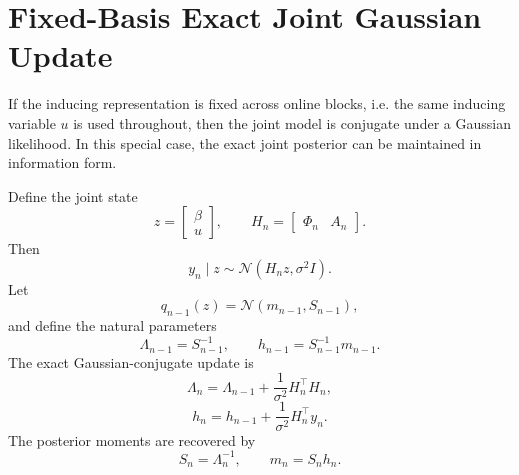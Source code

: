 \documentclass[12pt]{article}
\begin{document}
\section{Fixed-Basis Exact Joint Gaussian Update}

If the inducing representation is fixed across online blocks, i.e. the same inducing
variable $u$ is used throughout, then the joint model is conjugate under a Gaussian
likelihood. In this special case, the exact joint posterior can be maintained in
information form.

Define the joint state
\begin{equation}
z=
\begin{bmatrix}
\beta\\
u
\end{bmatrix},
\qquad
H_n=
\begin{bmatrix}
\Phi_n & A_n
\end{bmatrix}.
\label{eq:joint-state-fixed-basis}
\end{equation}
Then
\begin{equation}
y_n\mid z
\sim
\mathcal{N}(H_nz,\sigma^2I).
\end{equation}
Let
\begin{equation}
q_{n-1}(z)=\mathcal{N}(m_{n-1},S_{n-1}),
\end{equation}
and define the natural parameters
\begin{equation}
\Lambda_{n-1}=S_{n-1}^{-1},
\qquad
h_{n-1}=S_{n-1}^{-1}m_{n-1}.
\end{equation}
The exact Gaussian-conjugate update is
\begin{equation}
\Lambda_n
=
\Lambda_{n-1}
+
\frac{1}{\sigma^2}H_n^\top H_n,
\label{eq:joint-precision-update}
\end{equation}
\begin{equation}
h_n
=
h_{n-1}
+
\frac{1}{\sigma^2}H_n^\top y_n.
\label{eq:joint-info-update}
\end{equation}
The posterior moments are recovered by
\begin{equation}
S_n=\Lambda_n^{-1},
\qquad
m_n=S_nh_n.
\label{eq:joint-moment-recovery}
\end{equation}
\end{document}

